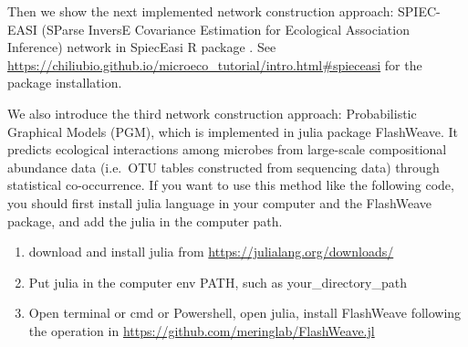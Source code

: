 \documentclass[
]{book}
\newenvironment{Shaded}{\begin{snugshade}}{\end{snugshade}}
\newcommand{\AttributeTok}[1]{\textcolor[rgb]{0.77,0.63,0.00}{#1}}
\newcommand{\CommentTok}[1]{\textcolor[rgb]{0.56,0.35,0.01}{\textit{#1}}}
\newcommand{\ConstantTok}[1]{\textcolor[rgb]{0.00,0.00,0.00}{#1}}
\newcommand{\FloatTok}[1]{\textcolor[rgb]{0.00,0.00,0.81}{#1}}
\newcommand{\FunctionTok}[1]{\textcolor[rgb]{0.00,0.00,0.00}{#1}}
\newcommand{\NormalTok}[1]{#1}
\newcommand{\OtherTok}[1]{\textcolor[rgb]{0.56,0.35,0.01}{#1}}
\newcommand{\SpecialCharTok}[1]{\textcolor[rgb]{0.00,0.00,0.00}{#1}}
\newcommand{\StringTok}[1]{\textcolor[rgb]{0.31,0.60,0.02}{#1}}
\providecommand{\tightlist}{%
  \setlength{\itemsep}{0pt}\setlength{\parskip}{0pt}}
\begin{document}
Then we show the next implemented network construction approach:
SPIEC-EASI (SParse InversE Covariance Estimation for Ecological Association Inference) network in SpiecEasi R package \citep{Kurtz_Sparse_2015}.
See \url{https://chiliubio.github.io/microeco_tutorial/intro.html\#spieceasi} for the package installation.

\begin{Shaded}
\end{Shaded}

We also introduce the third network construction approach: Probabilistic Graphical Models (PGM), which is implemented in julia package FlashWeave\citep{Tackmann_Rapid_2019}.
It predicts ecological interactions among microbes from large-scale compositional abundance data (i.e.~OTU tables constructed from sequencing data)
through statistical co-occurrence.
If you want to use this method like the following code, you should first install julia language in your computer and the FlashWeave package,
and add the julia in the computer path.

\begin{enumerate}
\def\labelenumi{\arabic{enumi}.}
\tightlist
\item
  download and install julia from \url{https://julialang.org/downloads/}\\
\item
  Put julia in the computer env PATH, such as your\_directory\_path\Julia\bin  
\item
  Open terminal or cmd or Powershell, open julia, install FlashWeave following the operation in \url{https://github.com/meringlab/FlashWeave.jl}
\end{enumerate}
\end{document}
